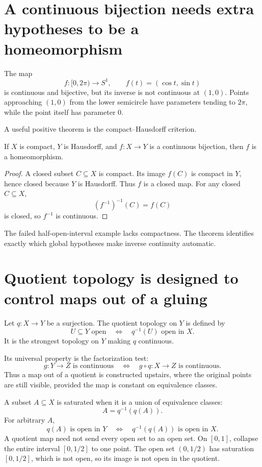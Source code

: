 \section{A continuous bijection needs extra hypotheses to be a homeomorphism}

The map
\[
  f:[0,2\pi)\to S^1,
  \qquad
  f(t)=(\cos t,\sin t)
\]
is continuous and bijective, but its inverse is not continuous at \((1,0)\).  Points approaching \((1,0)\) from the lower semicircle have parameters tending to \(2\pi\), while the point itself has parameter \(0\).

A useful positive theorem is the compact--Hausdorff criterion.

\begin{theorem}
If \(X\) is compact, \(Y\) is Hausdorff, and \(f:X\to Y\) is a continuous bijection, then \(f\) is a homeomorphism.
\end{theorem}

\begin{proof}
A closed subset \(C\subseteq X\) is compact.  Its image \(f(C)\) is compact in \(Y\), hence closed because \(Y\) is Hausdorff.  Thus \(f\) is a closed map.  For any closed \(C\subseteq X\),
\[
  (f^{-1})^{-1}(C)=f(C)
\]
is closed, so \(f^{-1}\) is continuous.
\end{proof}

The failed half-open-interval example lacks compactness.  The theorem identifies exactly which global hypotheses make inverse continuity automatic.

\section{Quotient topology is designed to control maps out of a gluing}

Let \(q:X\to Y\) be a surjection.  The quotient topology on \(Y\) is defined by
\[
  U\subseteq Y\text{ open}
  \quad\Longleftrightarrow\quad
  q^{-1}(U)\text{ open in }X.
\]
It is the strongest topology on \(Y\) making \(q\) continuous.

Its universal property is the factorization test:
\[
  g:Y\to Z\text{ is continuous}
  \quad\Longleftrightarrow\quad
  g\circ q:X\to Z\text{ is continuous}.
\]
Thus a map out of a quotient is constructed upstairs, where the original points are still visible, provided the map is constant on equivalence classes.

A subset \(A\subseteq X\) is saturated when it is a union of equivalence classes:
\[
  A=q^{-1}(q(A)).
\]
For arbitrary \(A\),
\[
  q(A)\text{ is open in }Y
  \quad\Longleftrightarrow\quad
  q^{-1}(q(A))\text{ is open in }X.
\]
A quotient map need not send every open set to an open set.  On \([0,1]\), collapse the entire interval \([0,1/2]\) to one point.  The open set \((0,1/2)\) has saturation \([0,1/2]\), which is not open, so its image is not open in the quotient.


